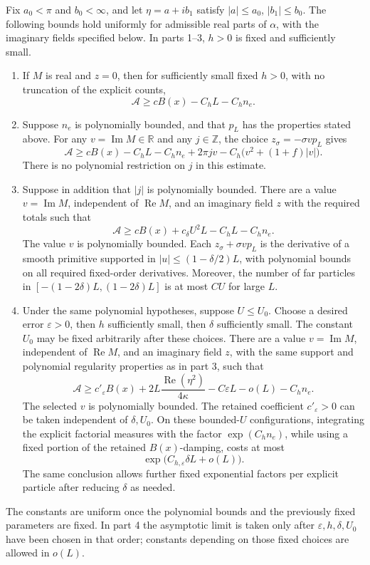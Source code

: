 \begin{proposition}\label{prop:03-trial-bounds}
Fix \(a_0<\pi\) and \(b_0<\infty\), and let
\(\eta=a+ib_1\) satisfy \(|a|\le a_0\), \(|b_1|\le b_0\).
The following bounds hold uniformly for admissible real parts of
\(\alpha\), with the imaginary fields specified below.  In parts 1--3,
\(h>0\) is fixed and sufficiently small.
\begin{enumerate}
\item If \(M\) is real and \(z=0\), then for sufficiently small
fixed \(h>0\), with no truncation of the explicit counts,
\[
 \mathcal A\ge cB(x)-C_hL-C_hn_e.
\]

\item Suppose \(n_e\) is polynomially bounded, and that \(p_L\)
has the properties stated above.  For any
\(v=\operatorname{Im}M\in\mathbb R\) and any \(j\in\mathbb Z\),
the choice \(z_\sigma=-\sigma vp_L\) gives
\[
 \mathcal A\ge cB(x)-C_hL-C_hn_e
       +2\pi jv-C_h\bigl(v^2+(1+f)|v|\bigr).
\]
There is no polynomial restriction on \(j\) in this estimate.

\item Suppose in addition that \(|j|\) is polynomially bounded.
There are a value \(v=\operatorname{Im}M\), independent of
\(\operatorname{Re}M\), and an imaginary field \(z\) with the
required totals such that
\[
 \mathcal A\ge cB(x)+c_\delta U^2L-C_hL-C_hn_e.
\]
The value \(v\) is polynomially bounded.  Each
\(z_\sigma+\sigma vp_L\) is the derivative of a smooth primitive
supported in \(|u|\le(1-\delta/2)L\), with polynomial bounds on
all required fixed-order derivatives.  Moreover, the number
of far particles in
\([-(1-2\delta)L,(1-2\delta)L]\) is at most \(CU\) for large \(L\).

\item Under the same polynomial hypotheses, suppose \(U\le U_0\).
Choose a desired error \(\varepsilon>0\), then \(h\) sufficiently
small, then \(\delta\) sufficiently small.  The constant \(U_0\)
may be fixed arbitrarily after these choices.  There are a value
\(v=\operatorname{Im}M\), independent of \(\operatorname{Re}M\),
and an imaginary field \(z\), with the same support and polynomial
regularity properties as in part 3, such that
\[
 \mathcal A\ge c'_\varepsilon B(x)
       +2L\frac{\operatorname{Re}(\eta^2)}{4\kappa}
       -C\varepsilon L-o(L)-C_hn_e.
\]
The selected \(v\) is polynomially bounded.
The retained coefficient \(c'_\varepsilon>0\) can be taken
independent of \(\delta,U_0\).  On these bounded-\(U\) configurations,
integrating the explicit factorial measures with the factor
\(\exp(C_hn_e)\), while using a fixed portion of the retained
\(B(x)\)-damping, costs at most
\[
 \exp\bigl(C_{h,\varepsilon}\delta L+o(L)\bigr).
\]
The same conclusion allows further fixed exponential factors per
explicit particle after reducing \(\delta\) as needed.
\end{enumerate}
The constants are uniform once the polynomial bounds and the previously
fixed parameters are fixed.  In part 4 the asymptotic limit is taken
only after \(\varepsilon,h,\delta,U_0\) have been chosen in that order;
constants depending on those fixed choices are allowed in \(o(L)\).
\end{proposition}
